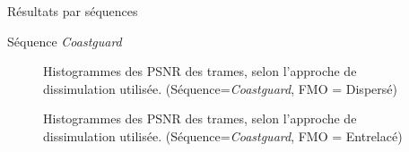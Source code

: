 \begin{section}{Résultats par séquences}
\begin{subsection}{Séquence \textit{Coastguard}}
\begin{figure} 
\caption[]{Histogrammes des PSNR des trames, selon l'approche de dissimulation
utilisée. (Séquence=\textit{Coastguard}, FMO = Dispersé)}
\label{fig-ParSequenceDispersed6}
\end{figure}

\begin{figure} 
\caption[]{Histogrammes des PSNR des trames, selon l'approche de dissimulation
utilisée. (Séquence=\textit{Coastguard}, FMO = Entrelacé)}
\label{fig-ParSequenceInterleaved6}
\end{figure}

\FloatBarrier
\end{subsection}


\end{section}
